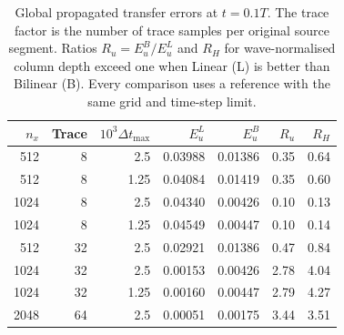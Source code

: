 \begin{table}[tbp]\centering\small
\caption{Global propagated transfer errors at $t=0.1T$. The trace factor
is the number of trace samples per original source segment. Ratios
$R_u=E_u^B/E_u^L$ and $R_H$ for wave-normalised
column depth exceed one when Linear (L) is better than Bilinear (B). Every
comparison uses a reference with the same grid and time-step limit.}
\label{tab:dynamic-errors}
\begin{tabular}{rrrrrrr}\toprule
$n_x$ & Trace & $10^3\Delta t_{\max}$ & $E_u^L$ & $E_u^B$ & $R_u$ & $R_H$ \\
\midrule
512 & 8 & 2.5 & 0.03988 & 0.01386 & 0.35 & 0.64 \\
512 & 8 & 1.25 & 0.04084 & 0.01419 & 0.35 & 0.60 \\
1024 & 8 & 2.5 & 0.04340 & 0.00426 & 0.10 & 0.13 \\
1024 & 8 & 1.25 & 0.04549 & 0.00447 & 0.10 & 0.14 \\
512 & 32 & 2.5 & 0.02921 & 0.01386 & 0.47 & 0.84 \\
1024 & 32 & 2.5 & 0.00153 & 0.00426 & 2.78 & 4.04 \\
1024 & 32 & 1.25 & 0.00160 & 0.00447 & 2.79 & 4.27 \\
2048 & 64 & 2.5 & 0.00051 & 0.00175 & 3.44 & 3.51 \\
\bottomrule\end{tabular}
\end{table}
